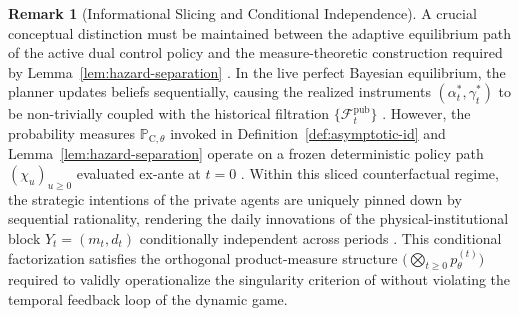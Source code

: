 \documentclass[ecta,nameyear,final,supplement]{econsocart}
\numberwithin{equation}{section}
\numberwithin{table}{section}
\theoremstyle{definition}
\newtheorem{remark}[theorem]{Remark}
\newcommand{\ProbC}[1]{\mathbb{P}_{\mathrm{C},#1}}
\begin{document}
\begin{remark}[Informational Slicing and Conditional Independence]\label{rem:info-slicing}
A crucial conceptual distinction must be maintained between the adaptive
equilibrium path of the active dual control policy and the measure-theoretic
construction required by Lemma~\ref{lem:hazard-separation}
\citep{Kakutani1948, BlackwellDubins1962}. In the live perfect Bayesian
equilibrium, the planner updates beliefs sequentially, causing the realized
instruments $(\alpha_t^*, \gamma_t^*)$ to be non-trivially coupled with the
historical filtration $\{\mathcal{F}_t^{\mathrm{pub}}\}$
\citep{AghionBoltonHarrisJullien1991, EasleyKiefer1988}. However, the
probability measures $\ProbC{\theta}$ invoked in
Definition~\ref{def:asymptotic-id} and Lemma~\ref{lem:hazard-separation}
operate on a frozen deterministic policy path $(\chi_u)_{u \ge 0}$ evaluated
ex-ante at $t=0$ \citep{BlackwellDubins1962}. Within this sliced
counterfactual regime, the strategic intentions of the private agents are
uniquely pinned down by sequential rationality, rendering the daily innovations
of the physical-institutional block $Y_t = (m_t, d_t)$ conditionally
independent across periods \citep{Kakutani1948}. This conditional factorization
satisfies the orthogonal product-measure structure
$\bigl(\bigotimes_{t \ge 0} p_{\theta}^{(t)}\bigr)$ required to validly
operationalize the singularity criterion of \citet{Kakutani1948} without
violating the temporal feedback loop of the dynamic game.
\end{remark}
\end{document}
